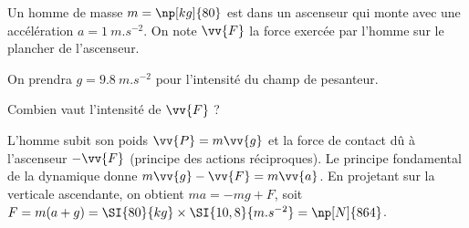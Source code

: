 
\finEntrainement




\newpage


\hauteurLargeurCadreReponse		{6mm}{3cm}
\initialisationEntrainement

Un homme de masse $m=\np[kg]{80}$ est dans un ascenseur qui monte avec une accélération $a = \SI{1}{m.s^{-2}}$. On note $\vv{F}$ la force exercée par l'homme sur le plancher de l'ascenseur.

On prendra $g=\SI{9,8}{m.s^{-2}}$ pour l'intensité du champ de pesanteur.

\debutEntrainement


\begin{enonce}
	 Combien vaut l'intensité de $\vv{F}$ ?
\end{enonce}


\begin{corrige}
L'homme subit son poids $\vv{P}=m \vv{g}$ et la force de contact dû à l'ascenseur $-\vv{F}$ (principe des actions réciproques). Le principe fondamental de la dynamique donne $m\vv{g}-\vv{F}=m \vv{a}$. En projetant sur la verticale ascendante, on obtient 
$ma=-mg+F$, soit $F=m(a+g)=\SI{80}{kg}\times \SI{10,8}{m.s^{-2}}=\np[N]{864}$.
\end{corrige}

